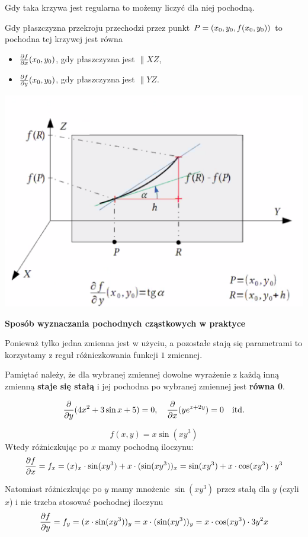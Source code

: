 Gdy taka krzywa jest regularna to możemy liczyć dla niej pochodną.

Gdy płaszczyzna przekroju przechodzi przez punkt $ P=(x_0, y_0, f(x_0, y_0)) $ to pochodna tej krzywej jest równa

\begin{itemize}
    \item $ \frac{\partial f}{\partial x} (x_0, y_0) $, gdy płaszczyzna jest $\parallel XZ $,
    \item $ \frac{\partial f}{\partial y} (x_0, y_0) $, gdy płaszczyzna jest $\parallel YZ $. 
\end{itemize}

\begin{center}
\includegraphics[scale=0.4]{img/interpretacja_geom.png}
\end{center}

\textbf{Sposób wyznaczania pochodnych cząstkowych w praktyce}

Ponieważ tylko jedna zmienna jest w użyciu, a pozostałe stają się parametrami to korzystamy z reguł różniczkowania
funkcji $1$ zmiennej.

Pamiętać należy, że dla wybranej zmiennej dowolne wyrażenie z każdą inną zmienną \textbf{staje się stałą} i jej pochodna
po wybranej zmiennej jest \textbf{równa 0}.

\begin{przyklad}
\[ \frac{\partial }{\partial y} (4x^2 + 3 \sin x + 5) = 0, \quad \frac{\partial }{\partial x} (ye^{z + 2y}) = 0 \quad \textrm{itd.} \]
\end{przyklad}

\begin{przyklad}

$$ f(x,y) = x \sin (xy^3) $$
Wtedy różniczkując po $x$ mamy pochodną iloczynu:
\[ \frac{\partial f}{\partial x} = f_x = (x)_x \cdot \sin(xy^3) + x \cdot (\sin (xy^3))_x = \sin(xy^3) + x \cdot \cos(xy^3) \cdot y^3 \]

Natomiast różniczkując po $y$ mamy mnożenie $\sin (xy^3)$ przez stałą dla $y$ (czyli $x$) i nie trzeba stosować pochodnej iloczynu
\[ \frac{\partial f}{\partial y} = f_y = (x \cdot \sin (xy^3))_y = x \cdot (\sin (xy^3))_y = x \cdot \cos(xy^3) \cdot 3y^2x \]
\end{przyklad}


